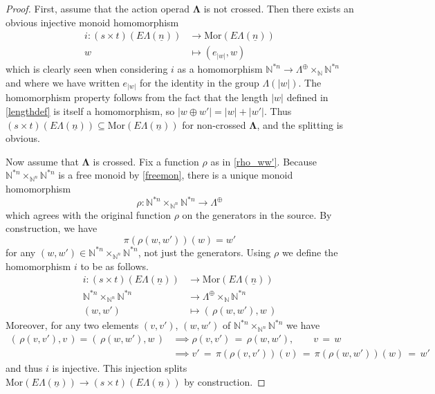 \documentclass{amsbook} %
\newcommand{\ML}{\mathbf{\Lambda}}
\newcommand{\lop}{\Lambda^{\oplus}}
\newcommand{\ELn}{E\Lambda(\underline{n})}
\numberwithin{section}{chapter}
\begin{document}
\begin{proof}
First, assume that the action operad $\ML$ is not crossed. Then there exists an obvious injective monoid homomorphism
  \begin{align*}
    i \colon (s \times t)(\ELn) &\rightarrow \mathrm{Mor}(\ELn) \\
    w & \mapsto (e_{|w|}, w)
  \end{align*}
which is clearly seen when considering $i$ as a homomorphism $\mathbb{N}^{\ast n} \rightarrow \lop \times_{\mathbb{N}} \mathbb{N}^{\ast n} $ and where we have written $e_{|w|}$ for the identity in the group $\Lambda(|w|)$. The homomorphism property follows from the fact that the length $|w|$ defined in \cref{lengthdef} is itself a homomorphism, so $|w \oplus w'| = |w|+|w'|$. Thus $(s \times t)(\ELn) \subseteq \mathrm{Mor}(\ELn)$ for non-crossed $\ML$, and the splitting is obvious.

Now assume that $\ML$ is crossed. Fix a function $\rho$ as in \cref{rho_ww'}. Because $\mathbb{N}^{\ast n} \times_{\mathbb{N}^n} \mathbb{N}^{\ast n}$ is a free monoid  by \cref{freemon}, there is a unique monoid homomorphism
  \[
    \rho \colon \mathbb{N}^{\ast n} \times_{\mathbb{N}^n} \mathbb{N}^{\ast n} \longrightarrow \lop
  \]
which agrees with the original function $\rho$ on the generators in the source. By construction, we have
  \[
    \pi(\rho(w, w'))(w) = w'
  \]
for any $(w, w') \in\mathbb{N}^{\ast n} \times_{\mathbb{N}^n} \mathbb{N}^{\ast n}$, not just the generators. Using $\rho$ we define the homomorphism $i$ to be as follows.
  \begin{align*}
		i \colon (s \times t)(\ELn) &\rightarrow \mathrm{Mor}(\ELn) \\
		\mathbb{N}^{\ast n} \times_{\mathbb{N}^n} \mathbb{N}^{\ast n} &\rightarrow \lop \times_{\mathbb{N}} \mathbb{N}^{\ast n} \\
		(w, w') &\mapsto ( \, \rho(w, w'), w \, )
	\end{align*}
Moreover, for any two elements $(v, v')$, $(w, w')$ of $\mathbb{N}^{\ast n} \times_{\mathbb{N}^n} \mathbb{N}^{\ast n}$ we have
  \begin{align*}
		( \, \rho(v, v'), v \, )  =  ( \, \rho(w, w'), w \, ) & \implies \rho(v, v') \, = \, \rho(w, w'), \quad \quad v \, = \, w \\
		 & \implies v' \, = \, \pi(\rho(v, v'))(v) \, = \, \pi(\rho(w, w'))(w) \, = \, w'
  \end{align*}
and thus $i$ is injective. This injection splits $\mathrm{Mor}(\ELn) \rightarrow (s \times t)(\ELn)$ by construction.


\end{proof}
\end{document}
